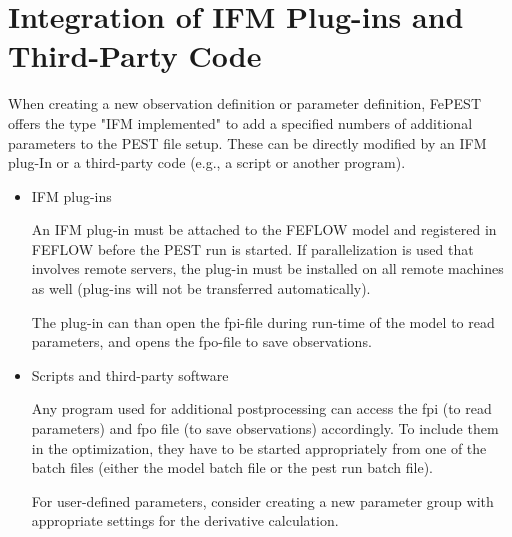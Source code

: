 \section{Integration of IFM Plug-ins and Third-Party Code}

When creating a new observation definition or parameter definition, FePEST offers the type "IFM implemented" to add a specified numbers of additional parameters to the PEST file setup. These can be directly modified by an IFM plug-In or a third-party code (e.g., a script or another program).

\begin{itemize}
\item IFM plug-ins

An IFM plug-in must be attached to the FEFLOW model and registered in FEFLOW before the PEST run is started. If parallelization is used that involves remote servers, the plug-in must be installed on all remote machines as well (plug-ins will not be transferred automatically).

The plug-in can than open the fpi-file during run-time of the model to read parameters, and opens the fpo-file to save observations.

\item Scripts and third-party software

Any program used for additional postprocessing can access the fpi (to read parameters) and fpo file (to save observations) accordingly. To include them in the optimization, they have to be started appropriately from one of the batch files (either the model batch file or the pest run batch file).

For user-defined parameters, consider creating a new parameter group with appropriate settings for the derivative calculation.

\end{itemize}